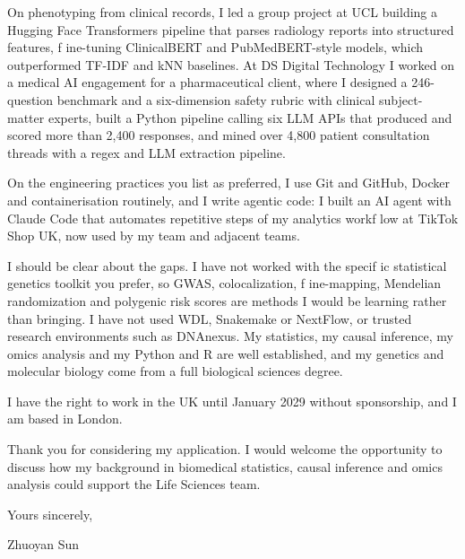 \documentclass[letterpaper,11pt]{article}
\begin{document}
On phenotyping from clinical records, I led a group project at UCL building a Hugging Face Transformers pipeline that parses radiology reports into structured features, f\kern0pt ine-tuning ClinicalBERT and PubMedBERT-style models, which outperformed TF-IDF and kNN baselines. At DS Digital Technology I worked on a medical AI engagement for a pharmaceutical client, where I designed a 246-question benchmark and a six-dimension safety rubric with clinical subject-matter experts, built a Python pipeline calling six LLM APIs that produced and scored more than 2,400 responses, and mined over 4,800 patient consultation threads with a regex and LLM extraction pipeline.

On the engineering practices you list as preferred, I use Git and GitHub, Docker and containerisation routinely, and I write agentic code: I built an AI agent with Claude Code that automates repetitive steps of my analytics workf\kern0pt low at TikTok Shop UK, now used by my team and adjacent teams.

I should be clear about the gaps. I have not worked with the specif\kern0pt ic statistical genetics toolkit you prefer, so GWAS, colocalization, f\kern0pt ine-mapping, Mendelian randomization and polygenic risk scores are methods I would be learning rather than bringing. I have not used WDL, Snakemake or NextFlow, or trusted research environments such as DNAnexus. My statistics, my causal inference, my omics analysis and my Python and R are well established, and my genetics and molecular biology come from a full biological sciences degree.

I have the right to work in the UK until January 2029 without sponsorship, and I am based in London.

Thank you for considering my application. I would welcome the opportunity to discuss how my background in biomedical statistics, causal inference and omics analysis could support the Life Sciences team.

\vspace{2pt}
Yours sincerely,

\vspace{8pt}
Zhuoyan Sun
\end{document}
